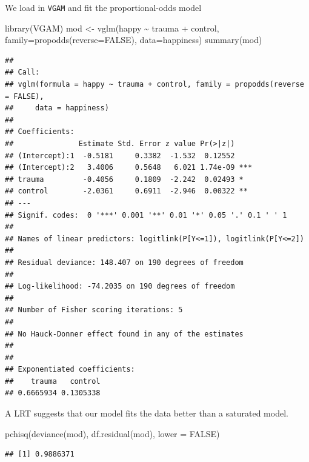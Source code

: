 \documentclass[
  ignorenonframetext,
]{beamer}
\newenvironment{Shaded}{\begin{snugshade}}{\end{snugshade}}
\newcommand{\AttributeTok}[1]{\textcolor[rgb]{0.77,0.63,0.00}{#1}}
\newcommand{\ConstantTok}[1]{\textcolor[rgb]{0.00,0.00,0.00}{#1}}
\newcommand{\FunctionTok}[1]{\textcolor[rgb]{0.00,0.00,0.00}{#1}}
\newcommand{\NormalTok}[1]{#1}
\newcommand{\OtherTok}[1]{\textcolor[rgb]{0.56,0.35,0.01}{#1}}
\newcommand{\SpecialCharTok}[1]{\textcolor[rgb]{0.00,0.00,0.00}{#1}}
\begin{document}
\begin{frame}[fragile]{}
\protect\hypertarget{section-1}{}
We load in \texttt{VGAM} and fit the proportional-odds model

\vspace{12pt}
\tiny

\begin{Shaded}
\begin{Highlighting}[]
\FunctionTok{library}\NormalTok{(VGAM)}
\NormalTok{mod }\OtherTok{\textless{}{-}} \FunctionTok{vglm}\NormalTok{(happy }\SpecialCharTok{\textasciitilde{}}\NormalTok{ trauma }\SpecialCharTok{+}\NormalTok{ control, }\AttributeTok{family=}\FunctionTok{propodds}\NormalTok{(}\AttributeTok{reverse=}\ConstantTok{FALSE}\NormalTok{),}
            \AttributeTok{data=}\NormalTok{happiness)}
\FunctionTok{summary}\NormalTok{(mod)}
\end{Highlighting}
\end{Shaded}

\begin{verbatim}
## 
## Call:
## vglm(formula = happy ~ trauma + control, family = propodds(reverse = FALSE), 
##     data = happiness)
## 
## Coefficients: 
##               Estimate Std. Error z value Pr(>|z|)    
## (Intercept):1  -0.5181     0.3382  -1.532  0.12552    
## (Intercept):2   3.4006     0.5648   6.021 1.74e-09 ***
## trauma         -0.4056     0.1809  -2.242  0.02493 *  
## control        -2.0361     0.6911  -2.946  0.00322 ** 
## ---
## Signif. codes:  0 '***' 0.001 '**' 0.01 '*' 0.05 '.' 0.1 ' ' 1
## 
## Names of linear predictors: logitlink(P[Y<=1]), logitlink(P[Y<=2])
## 
## Residual deviance: 148.407 on 190 degrees of freedom
## 
## Log-likelihood: -74.2035 on 190 degrees of freedom
## 
## Number of Fisher scoring iterations: 5 
## 
## No Hauck-Donner effect found in any of the estimates
## 
## 
## Exponentiated coefficients:
##    trauma   control 
## 0.6665934 0.1305338
\end{verbatim}
\end{frame}

\begin{frame}[fragile]{}
\protect\hypertarget{section-2}{}
A LRT suggests that our model fits the data better than a saturated
model.

\vspace{12pt}
\small

\begin{Shaded}
\begin{Highlighting}[]
\FunctionTok{pchisq}\NormalTok{(}\FunctionTok{deviance}\NormalTok{(mod), }\FunctionTok{df.residual}\NormalTok{(mod), }\AttributeTok{lower =} \ConstantTok{FALSE}\NormalTok{)}
\end{Highlighting}
\end{Shaded}

\begin{verbatim}
## [1] 0.9886371
\end{verbatim}
\end{frame}
\end{document}
